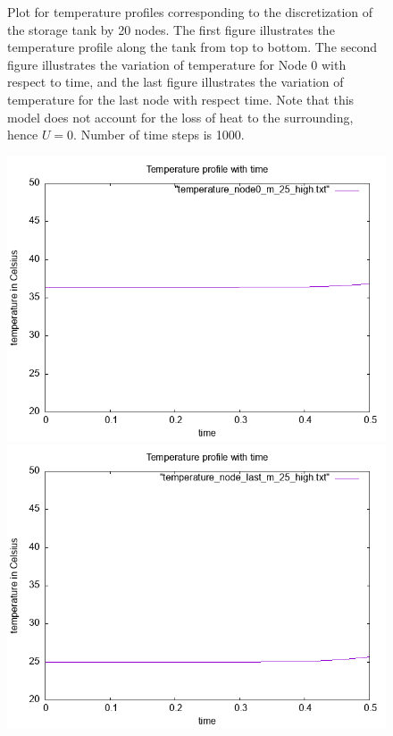\documentclass{article}
\begin{document}
\begin{figure}[ht]
\caption{Plot for temperature profiles corresponding to the discretization of the storage tank by 20 nodes. The first figure illustrates the temperature profile along the tank from top to bottom. The second figure illustrates the variation of temperature for Node 0 with respect to time, and the last figure illustrates the variation of temperature for the last node with respect time. Note that this model does not account for the loss of heat to the surrounding, hence $U = 0$. Number of time steps is 1000. }
\end{figure}



\begin{figure}[ht]
\centering
\includegraphics[scale =0.4]{temperature_node0_N_20_m_25.png}
\includegraphics[scale =0.4]{temperature_node_last_N_20_m_25.png}

\end{figure}
\end{document}

